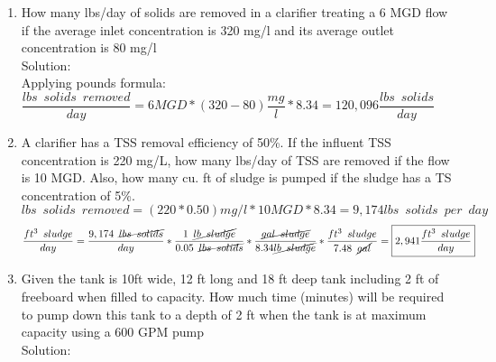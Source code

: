 \begin{enumerate}

\item How many lbs/day of solids are removed in a clarifier treating a 6 MGD flow if the average inlet concentration is 320 mg/l and its average outlet concentration is 80 mg/l\\
\vspace{0.5cm}
Solution:\\
\vspace{0.5cm}
Applying pounds formula:\\
$\dfrac{lbs \enspace solids \enspace removed}{day}=6MGD*(320-80)\dfrac{mg}{l}*8.34=\boxed{120,096\dfrac{lbs \enspace solids}{day}}$

\item A clarifier has a TSS removal efficiency of 50\%.  If the influent TSS concentration is 220 mg/L, how many lbs/day of TSS are removed if the flow is 10 MGD.  Also, how many cu. ft of sludge is pumped if the sludge has a TS concentration of 5\%.\\
$lbs \enspace solids \enspace removed=(220*0.50)mg/l*10MGD*8.34=9,174lbs \enspace solids \enspace per \enspace day$
$$\dfrac{ft^3\enspace sludge}{day}= \dfrac{9,174 \enspace \cancel{lbs \enspace solids}}{day} * \dfrac{1 \enspace \cancel{lb \enspace sludge}}{0.05\enspace \cancel{lbs \enspace solids}}*\dfrac{\cancel{gal \enspace sludge}}{8.34\cancel{lb \enspace sludge}}*\dfrac{ft^3 \enspace sludge}{7.48 \enspace \cancel{gal}}=\boxed{2,941\dfrac{ft^3 \enspace sludge}{day}} $$

\item Given the tank is 10ft wide, 12 ft long and 18 ft deep tank including 2 ft of freeboard when filled to capacity. How much time (minutes) will be required to pump down this tank to a depth of 2 ft when the tank is at maximum capacity using a 600 GPM pump\\
Solution:\\
\vspace{0.5cm}

\begin{tikzpicture}


\end{tikzpicture}
\end{enumerate}
